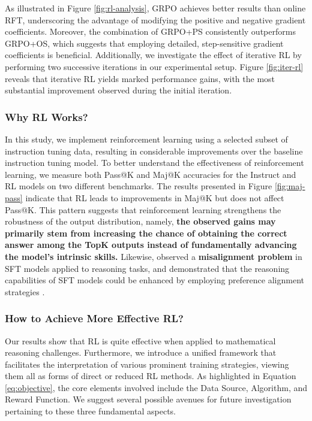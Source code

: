 \begin{itemize}[topsep=0pt]
As illustrated in Figure \ref{fig:rl-analysis}, GRPO achieves better results than online RFT, underscoring the advantage of modifying the positive and negative gradient coefficients. Moreover, the combination of GRPO+PS consistently outperforms GRPO+OS, which suggests that employing detailed, step-sensitive gradient coefficients is beneficial. Additionally, we investigate the effect of iterative RL by performing two successive iterations in our experimental setup. Figure \ref{fig:iter-rl} reveals that iterative RL yields marked performance gains, with the most substantial improvement observed during the initial iteration.

\subsubsection{Why RL Works?} In this study, we implement reinforcement learning using a selected subset of instruction tuning data, resulting in considerable improvements over the baseline instruction tuning model. To better understand the effectiveness of reinforcement learning, we measure both Pass@K and Maj@K accuracies for the Instruct and RL models on two different benchmarks. The results presented in Figure \ref{fig:maj-pass} indicate that RL leads to improvements in Maj@K but does not affect Pass@K. This pattern suggests that reinforcement learning strengthens the robustness of the output distribution, namely, \textbf{the observed gains may primarily stem from increasing the chance of obtaining the correct answer among the TopK outputs instead of fundamentally advancing the model’s intrinsic skills.} Likewise, \citep{wang2023making} observed a \textbf{misalignment problem} in SFT models applied to reasoning tasks, and demonstrated that the reasoning capabilities of SFT models could be enhanced by employing preference alignment strategies \citep{yuan2023rrhf,song2023preference,wang2023making}.

\subsubsection{How to Achieve More Effective RL?}
\label{sec:effec_rl}
Our results show that RL is quite effective when applied to mathematical reasoning challenges. Furthermore, we introduce a unified framework that facilitates the interpretation of various prominent training strategies, viewing them all as forms of direct or reduced RL methods. As highlighted in Equation \ref{eq:objective}, the core elements involved include the Data Source, Algorithm, and Reward Function. We suggest several possible avenues for future investigation pertaining to these three fundamental aspects.


\end{itemize}
